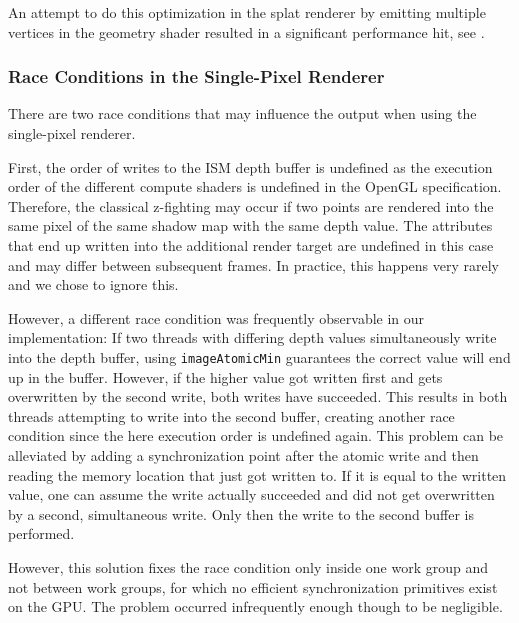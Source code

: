 
 An attempt to do this optimization in the splat renderer by emitting multiple vertices in the geometry shader resulted in a significant performance hit, see .


 \subsubsection{Race Conditions in the Single-Pixel Renderer}

 There are two race conditions that may influence the output when using the single-pixel renderer.

 First, the order of writes to the ISM depth buffer is undefined as the execution order of the different compute shaders is undefined in the OpenGL specification. Therefore, the classical z-fighting may occur if two points are rendered into the same pixel of the same shadow map with the same depth value. The attributes that end up written into the additional render target are undefined in this case and may differ between subsequent frames. In practice, this happens very rarely and we chose to ignore this.

 However, a different race condition was frequently observable in our implementation:
 If two threads with differing depth values simultaneously write into the depth buffer, using \texttt{imageAtomicMin} guarantees the correct value will end up in the buffer. However, if the higher value got written first and gets overwritten by the second write, both writes have succeeded. This results in both threads attempting to write into the second buffer, creating another race condition since the here execution order is undefined again. This problem can be alleviated by adding a synchronization point after the atomic write and then reading the memory location that just got written to. If it is equal to the written value, one can assume the write actually succeeded and did not get overwritten by a second, simultaneous write. Only then the write to the second buffer is performed.

 However, this solution fixes the race condition only inside one work group and not between work groups, for which no efficient synchronization primitives exist on the GPU. The problem occurred infrequently enough though to be negligible.

